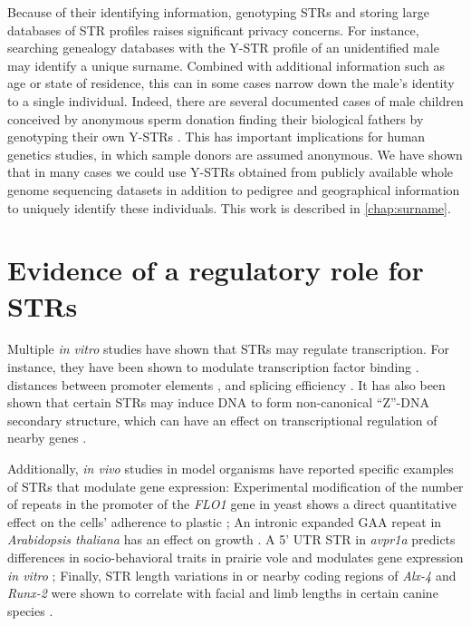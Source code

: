 Because of their identifying information, genotyping STRs and storing large databases of STR profiles raises significant privacy concerns. For instance, searching genealogy databases with the Y-STR profile of an unidentified male may identify a unique surname. Combined with additional information such as age or state of residence, this can in some cases narrow down the male's identity to a single individual. Indeed, there are several documented cases of male children conceived by anonymous sperm donation finding their biological fathers by genotyping their own Y-STRs \cite{Motluk2005,Lehmann-Haupt2010}. This has important implications for human genetics studies, in which sample donors are assumed anonymous. We have shown that in many cases we could use Y-STRs obtained from publicly available whole genome sequencing datasets in addition to pedigree and geographical information to uniquely identify these individuals. This work is described in \autoref{chap:surname}. 

\section{Evidence of a regulatory role for STRs}
Multiple \emph{in vitro} studies have shown that STRs may regulate transcription. For instance, they have been shown to modulate transcription factor binding \cite{ContenteDittmerKochEtAl2002,MartinMakepeaceHillEtAl2005}. distances between promoter elements \cite{WillemsPaulHeideEtAl1990,YogevRosengartenWatson-McKownEtAl1991}, and splicing efficiency \cite{HefferonGromanYurkEtAl2004,HuiHungHeinerEtAl2005}. It has also been shown that certain STRs may induce DNA to form non-canonical ``Z''-DNA secondary structure, which can have an effect on transcriptional regulation of nearby genes \cite{RothenburgKoch-NolteRichEtAl2001}.

Additionally, \emph{in vivo} studies in model organisms have reported specific examples of STRs that modulate gene expression: Experimental modification of the number of repeats in the promoter of the \emph{FLO1} gene in yeast shows a direct quantitative effect on the cells' adherence to plastic \cite{VerstrepenJansenLewitterEtAl2005}; An intronic expanded GAA repeat in \emph{Arabidopsis thaliana} has an effect on growth \cite{SureshkumarTodescoSchneebergerEtAl2009}. A 5' UTR STR in \emph{avpr1a} predicts differences in socio-behavioral traits in prairie vole and modulates gene expression \emph{in vitro} \cite{HammockYoung2005}; Finally, STR length variations in or nearby coding regions of \emph{Alx-4} and \emph{Runx-2} were shown to correlate with facial and limb lengths in certain canine species \cite{FondonGarner2004}.

